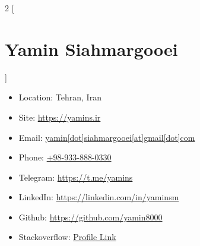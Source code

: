 \begin{multicols}{2}
[\section*{\LARGE{Yamin Siahmargooei}}]
    \begin{itemize}
        \item Location: Tehran, Iran
        \item Site: \href{https://yamins.ir}{https://yamins.ir}
        \item Email: \href{mailto:yamin.siahmargooei@gmail.com}{yamin[dot]siahmargooei[at]gmail[dot]com}
        \item Phone: \href{tel:0989338880330}{+98-933-888-0330}
        \item Telegram: \href{https://t.me/yamins}{https://t.me/yamins}
        \item LinkedIn: \href{https://linkedin.com/in/yaminsm}{https://linkedin.com/in/yaminsm}
        \item Github: \href{https://github.com/yamin8000}{https://github.com/yamin8000}
        \item Stackoverflow: \href{https://stackoverflow.com/users/15055605/yamin}{Profile Link}
    \end{itemize}
\end{multicols}